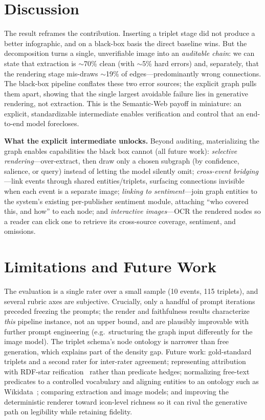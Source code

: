 \documentclass[sigconf,natbib=false, language=english]{acmart}
\begin{document}
\section{Discussion}
The result reframes the contribution. Inserting a triplet stage did not produce a better infographic, and on a black-box basis the direct baseline wins. But the decomposition turns a single, unverifiable image into an \emph{auditable chain}: we can state that extraction is $\sim$70\% clean (with $\sim$5\% hard errors) and, separately, that the rendering stage mis-draws $\sim$19\% of edges---predominantly wrong connections. The black-box pipeline conflates these two error sources; the explicit graph pulls them apart, showing that the single largest avoidable failure lies in generative rendering, not extraction. This is the Semantic-Web payoff in miniature: an explicit, standardizable intermediate enables verification and control that an end-to-end model forecloses.

\textbf{What the explicit intermediate unlocks.} Beyond auditing, materializing the graph enables capabilities the black box cannot (all future work): \emph{selective rendering}---over-extract, then draw only a chosen subgraph (by confidence, salience, or query) instead of letting the model silently omit; \emph{cross-event bridging}---link events through shared entities/triplets, surfacing connections invisible when each event is a separate image; \emph{linking to sentiment}---join graph entities to the system's existing per-publisher sentiment module, attaching ``who covered this, and how'' to each node; and \emph{interactive images}---OCR the rendered nodes so a reader can click one to retrieve its cross-source coverage, sentiment, and omissions.

\section{Limitations and Future Work}
The evaluation is a single rater over a small sample (10 events, 115 triplets), and several rubric axes are subjective. Crucially, only a handful of prompt iterations preceded freezing the prompts; the render and faithfulness results characterize \emph{this} pipeline instance, not an upper bound, and are plausibly improvable with further prompt engineering (e.g.\ structuring the graph input differently for the image model). The triplet schema's node ontology is narrower than free generation, which explains part of the density gap. Future work: gold-standard triplets and a second rater for inter-rater agreement; representing attribution with RDF-star reification~\cite{rdfstar} rather than predicate hedges; normalizing free-text predicates to a controlled vocabulary and aligning entities to an ontology such as Wikidata~\cite{chepurova2025wikontic}; comparing extraction and image models; and improving the deterministic renderer toward icon-level richness so it can rival the generative path on legibility while retaining fidelity.
\end{document}
